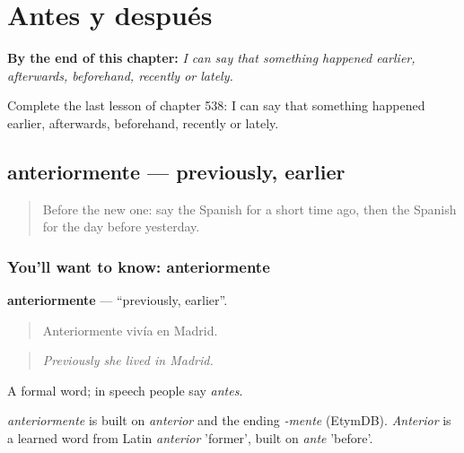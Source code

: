 
\chapter{Antes y después}
\label{ch:es-antes-y-despues}

\begin{chapteropening}
\textbf{By the end of this chapter:} \emph{I can say that something happened earlier, afterwards, beforehand, recently or lately.}

Complete the last lesson of chapter 538: I can say that something happened earlier, afterwards, beforehand, recently or lately.
\end{chapteropening}

\section[anteriormente]{anteriormente — previously, earlier}

\label{lesson:ES-C538-anteriormente}



\begin{quote}
Before the new one: say the Spanish for a short time ago, then the Spanish for the day before yesterday.
\end{quote}

\subsection*{You'll want to know: anteriormente}
\textbf{anteriormente} — \textquotedblleft{}previously, earlier\textquotedblright{}.

\begin{quote}
Anteriormente vivía en Madrid.
\end{quote}

\begin{quote}
\emph{Previously she lived in Madrid.}
\end{quote}

A formal word; in speech people say \emph{antes}.

\begin{cousinweb}
\emph{anteriormente} is built on \emph{anterior} and the ending \emph{-mente} (EtymDB). \emph{Anterior} is a learned word from Latin \emph{anterior} 'former', built on \emph{ante} 'before'.
\end{cousinweb}

